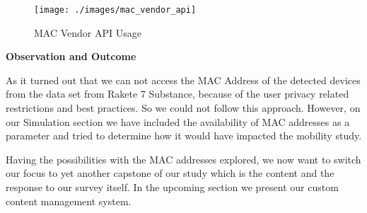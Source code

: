 \begin{figure}[H]
	\centering
	\texttt{[image: ./images/mac\_vendor\_api]}
	\caption{MAC Vendor API Usage}
	\label{figure1:mac_vendor_api_usage}
\end{figure}

\textbf{Observation and Outcome}

As it turned out that we can not access the MAC Address of the detected devices from the data set from Rakete 7 Substance, because of the user privacy related restrictions and best practices. So we could not follow this approach. However, on our Simulation section we have included the availability of MAC addresses as a parameter and tried to determine how it would have impacted the mobility study.

Having the possibilities with the MAC addresses explored, we now want to switch our focus to yet another capstone of our study which is the content and the response to our survey itself. In the upcoming section we present our custom content management system.
